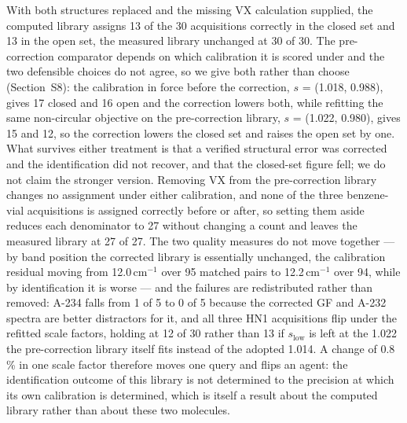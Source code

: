 \documentclass[review,12pt]{elsarticle}
\newcommand*\wn{\ensuremath{\text{cm}^{-1}}}
\begin{document}
With both structures replaced and the missing VX calculation supplied, the computed library
assigns 13 of the 30 acquisitions correctly in the closed set and 13 in the open set, the
measured library unchanged at 30 of 30. The pre-correction comparator depends on which
calibration it is scored under and the two defensible choices do not agree, so we give both
rather than choose (Section~S8): the calibration in force before the correction,
$s$ = (1.018, 0.988), gives 17 closed and 16 open and the correction lowers both, while
refitting the same non-circular objective on the pre-correction library, $s$ = (1.022,
0.980), gives 15 and 12, so the correction lowers the closed set and raises the open set by
one. What survives either treatment is that a verified structural error was corrected and
the identification did not recover, and that the closed-set figure fell; we do not claim
the stronger version. Removing VX from the pre-correction library changes no assignment
under either calibration, and none of the three benzene-vial acquisitions is assigned
correctly before or after, so setting them aside reduces each denominator to 27 without
changing a count and leaves the measured library at 27 of 27. The two quality measures do
not move together --- by band position the corrected library is essentially unchanged, the
calibration residual moving from 12.0\,\wn{} over 95 matched pairs to 12.2\,\wn{} over 94,
while by identification it is worse --- and the failures are redistributed rather than
removed: A-234 falls from 1 of 5 to 0 of 5 because the corrected GF and A-232 spectra are
better distractors for it, and all three HN1 acquisitions flip under the refitted scale
factors, holding at 12 of 30 rather than 13 if $s_\mathrm{low}$ is left at the 1.022 the
pre-correction library itself fits instead of the adopted 1.014. A change of 0.8\,\% in one
scale factor therefore moves one query and flips an agent: the identification outcome of
this library is not determined to the precision at which its own calibration is determined,
which is itself a result about the computed library rather than about these two molecules.
\end{document}
